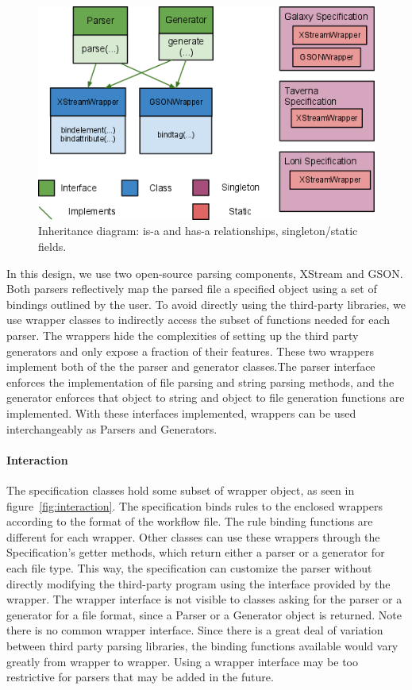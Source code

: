 \documentclass[12pt]{article}
\begin{document}
\begin{figure}[htbp]
\centering
\includegraphics[width=\textwidth]{inheritance.png}
\caption{Inheritance diagram: is-a and has-a relationships, singleton/static fields.}
\label{fig:inheritance}
\end{figure}

In this design, we use two open-source parsing components, XStream and GSON. Both parsers reflectively map the parsed file a specified object using a set of bindings outlined by the user. To avoid directly using the third-party libraries, we use wrapper classes to indirectly access the subset of functions needed for each parser. The wrappers hide the complexities of setting up the third party generators and only expose a fraction of their features. These  two wrappers implement both of the the parser and generator classes.The parser interface enforces the implementation of file parsing and string parsing methods, and the generator enforces that object to string and object to file generation functions are implemented. With these interfaces implemented, wrappers can be used interchangeably as Parsers and Generators. 



\paragraph{Interaction}


The specification classes hold some subset of wrapper object, as seen in figure~\ref{fig:interaction}. The specification binds rules to the enclosed wrappers according to the format of the workflow file. The rule binding functions are different for each wrapper.  Other classes can use these wrappers through the Specification's getter methods, which return either a parser or a generator for each file type. This way, the specification can customize the parser without directly modifying the third-party program using the interface provided by the wrapper. The wrapper interface is not visible to classes asking for the parser or a generator for a file format, since a Parser or a Generator object is returned. Note there is no common wrapper interface. Since there is a great deal of variation between third party parsing libraries, the binding functions available would vary greatly from wrapper to wrapper. Using a wrapper interface may be too restrictive for parsers that may be added in the future.
\end{document}
